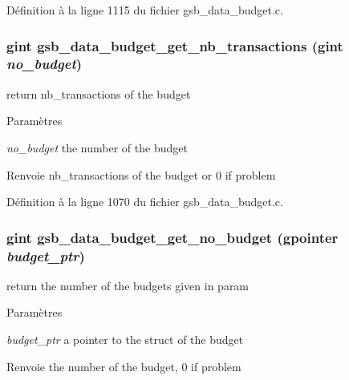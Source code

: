 Définition à la ligne 1115 du fichier gsb\_\-data\_\-budget.c.

\subsubsection[{gsb\_\-data\_\-budget\_\-get\_\-nb\_\-transactions}]{\setlength{\rightskip}{0pt plus 5cm}gint gsb\_\-data\_\-budget\_\-get\_\-nb\_\-transactions (gint {\em no\_\-budget})}\label{gsb__data__budget_8h_ac8284c60c6666fcd5a9cfe61ea69502b}
return nb\_\-transactions of the budget


\begin{DoxyParams}{Paramètres}
\item[{\em no\_\-budget}]the number of the budget\end{DoxyParams}
\begin{DoxyReturn}{Renvoie}
nb\_\-transactions of the budget or 0 if problem 
\end{DoxyReturn}


Définition à la ligne 1070 du fichier gsb\_\-data\_\-budget.c.

\subsubsection[{gsb\_\-data\_\-budget\_\-get\_\-no\_\-budget}]{\setlength{\rightskip}{0pt plus 5cm}gint gsb\_\-data\_\-budget\_\-get\_\-no\_\-budget (gpointer {\em budget\_\-ptr})}\label{gsb__data__budget_8h_ac49b01b1bea1214e11e6f4d917d2e96a}
return the number of the budgets given in param


\begin{DoxyParams}{Paramètres}
\item[{\em budget\_\-ptr}]a pointer to the struct of the budget\end{DoxyParams}
\begin{DoxyReturn}{Renvoie}
the number of the budget, 0 if problem 
\end{DoxyReturn}


